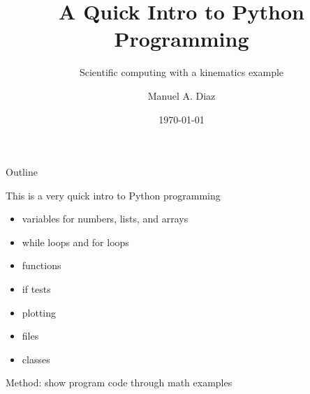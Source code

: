 \documentclass[aspectratio=169,11pt]{beamer}
\title{A Quick Intro to Python Programming}
\subtitle{Scientific computing with a kinematics example}
\author{Manuel A. Diaz}
\institute{InspiraSTEM Internship}
\date{\today}
\begin{document}

\begin{frame}
  \titlepage
\end{frame}

\begin{frame}{Outline}
  \tableofcontents
\end{frame}

\begin{frame}{This is a very quick intro to Python programming}
  \begin{itemize}
    \item variables for numbers, lists, and arrays
    \item while loops and for loops
    \item functions
    \item if tests
    \item plotting
    \item files
    \item classes
  \end{itemize}
  \vspace{1em}
  Method: show program code through math examples
\end{frame}






\end{document}
